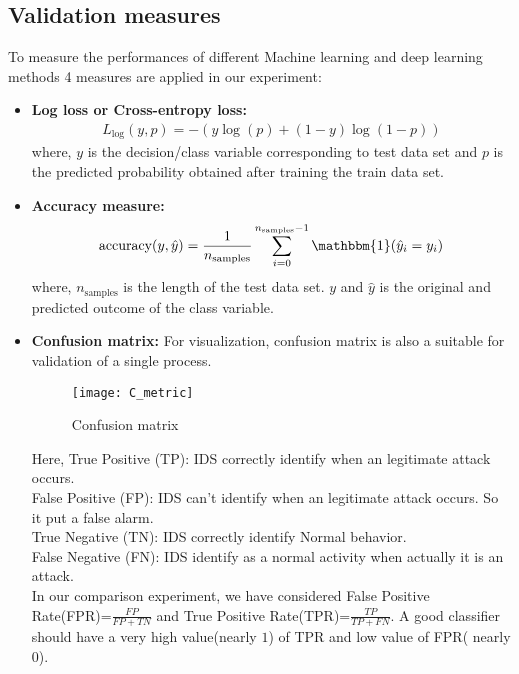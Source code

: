 \documentclass{llncs}
\begin{document}
\subsection{Validation measures}
To measure the performances of different Machine learning and deep learning methods 4 measures are applied in our experiment:
\begin{itemize}
\item \textbf{Log loss or Cross-entropy loss\cite{Loss}:}
\begin{align*}
L_{\log}(y,p) = -(y\log(p)+(1-y)\log(1-p))
\end{align*}
where, $y$ is the decision/class variable corresponding to test data set and $p$ is the predicted probability obtained after training the train data set. 
\item \textbf{Accuracy measure:}
\begin{align*}
\text{accuracy}(y,\hat{y}) = \frac{1}{n_{\text{samples}}} \sum_{i=0}^{n_{\text{samples}} - 1} \mathbbm{1}(\hat{y}_i = y_i)
\end{align*}
where, $n_\text{samples}$ is the length of the test data set.
$y$ and $\hat{y}$ is the original and predicted outcome of the class variable.
\item \textbf{Confusion matrix:} 
For visualization, confusion matrix is also a suitable for validation of a single process.
\begin{figure}
\centering
  \texttt{[image: C\_metric]}
  \caption{Confusion matrix \cite{article1}}
\end{figure} 
Here,
True Positive (TP): IDS correctly identify when an legitimate attack occurs. \\
False Positive (FP): IDS can't identify when an legitimate attack occurs. So it put a false alarm. \\
True Negative (TN): IDS correctly identify Normal behavior.\\
False Negative (FN): IDS identify as a normal activity when actually it is an attack.\\
In our comparison experiment, we have considered False Positive Rate(FPR)=$\frac{FP}{FP+TN}$ and True Positive Rate(TPR)=$\frac{TP}{TP+FN}.$ A good classifier should have a very high value(nearly $1$) of TPR and low value of FPR( nearly $0$).
\end{itemize} 
\end{document}
